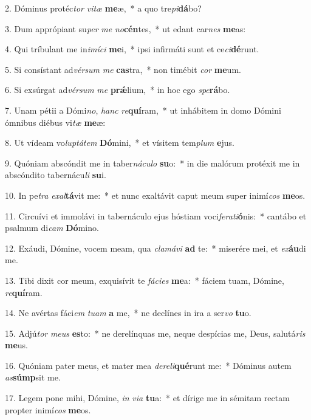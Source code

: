2. Dóminus protéc\textit{tor} \textit{vi}\textit{tæ} \textbf{me}æ,~*  a quo tre\textit{pi}\textbf{dá}bo?\

3. Dum apprópiant su\textit{per} \textit{me} \textit{no}\textbf{cén}tes,~*  ut edant car\textit{nes} \textbf{me}as:\

4. Qui tríbulant me in\textit{i}\textit{mí}\textit{ci} \textbf{me}i,~*  ipsi infirmáti sunt et ce\textit{ci}\textbf{dé}runt.\

5. Si consístant ad\textit{vér}\textit{sum} \textit{me} \textbf{cas}tra,~*  non timébit \textit{cor} \textbf{me}um.\

6. Si exsúrgat ad\textit{vér}\textit{sum} \textit{me} \textbf{prǽ}lium,~*  in hoc ego \textit{spe}\textbf{rá}bo.\

7. Unam pétii a Dómi\textit{no}, \textit{hanc} \textit{re}\textbf{quí}ram,~*  ut inhábitem in domo Dómini ómnibus diébus vi\textit{tæ} \textbf{me}æ:\

8. Ut vídeam vo\textit{lup}\textit{tá}\textit{tem} \textbf{Dó}mini,~*  et vísitem tem\textit{plum} \textbf{e}jus.\

9. Quóniam abscóndit me in taber\textit{ná}\textit{cu}\textit{lo} \textbf{su}o:~*  in die malórum protéxit me in abscóndito tabernácu\textit{li} \textbf{su}i.\

10. In pe\textit{tra} \textit{ex}\textit{al}\textbf{tá}vit me:~*  et nunc exaltávit caput meum super inimí\textit{cos} \textbf{me}os.\

11. Circuívi et immolávi in tabernáculo ejus hóstiam voci\textit{fe}\textit{ra}\textit{ti}\textbf{ó}nis:~*  cantábo et psalmum di\textit{cam} \textbf{Dó}mino.\

12. Exáudi, Dómine, vocem meam, qua \textit{cla}\textit{má}\textit{vi} \textbf{ad} te:~*  miserére mei, et \textit{ex}\textbf{áu}di me.\

13. Tibi dixit cor meum, exquisívit te \textit{fá}\textit{ci}\textit{es} \textbf{me}a:~*  fáciem tuam, Dómine, \textit{re}\textbf{quí}ram.\

14. Ne avértas fáci\textit{em} \textit{tu}\textit{am} \textbf{a} me,~*  ne declínes in ira a ser\textit{vo} \textbf{tu}o.\

15. Adjú\textit{tor} \textit{me}\textit{us} \textbf{es}to:~*  ne derelínquas me, neque despícias me, Deus, salutá\textit{ris} \textbf{me}us.\

16. Quóniam pater meus, et mater mea \textit{de}\textit{re}\textit{li}\textbf{qué}runt me:~*  Dóminus autem \textit{as}\textbf{súmp}sit me.\

17. Legem pone mihi, Dómine, \textit{in} \textit{vi}\textit{a} \textbf{tu}a:~*  et dírige me in sémitam rectam propter inimí\textit{cos} \textbf{me}os.\


